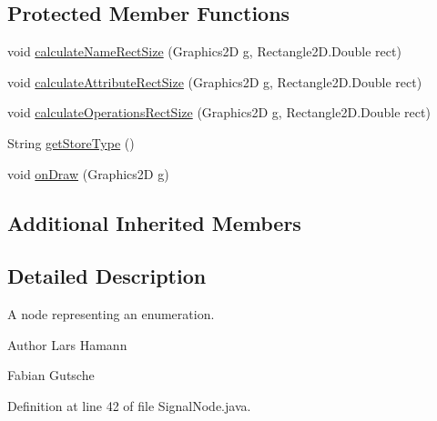 \subsection*{Protected Member Functions}
\begin{DoxyCompactItemize}
\item 
void \hyperlink{classorg_1_1tzi_1_1use_1_1gui_1_1views_1_1diagrams_1_1classdiagram_1_1_signal_node_afdb8c551c1f070d72bf37614e34f9742}{calculate\-Name\-Rect\-Size} (Graphics2\-D g, Rectangle2\-D.\-Double rect)
\item 
void \hyperlink{classorg_1_1tzi_1_1use_1_1gui_1_1views_1_1diagrams_1_1classdiagram_1_1_signal_node_a64b7da3d87dfedd68531751924203991}{calculate\-Attribute\-Rect\-Size} (Graphics2\-D g, Rectangle2\-D.\-Double rect)
\item 
void \hyperlink{classorg_1_1tzi_1_1use_1_1gui_1_1views_1_1diagrams_1_1classdiagram_1_1_signal_node_a11d72401f12a7cccb816b663c3adbdc0}{calculate\-Operations\-Rect\-Size} (Graphics2\-D g, Rectangle2\-D.\-Double rect)
\item 
String \hyperlink{classorg_1_1tzi_1_1use_1_1gui_1_1views_1_1diagrams_1_1classdiagram_1_1_signal_node_ac550fb54ba18b999593d43695994cc2d}{get\-Store\-Type} ()
\item 
void \hyperlink{classorg_1_1tzi_1_1use_1_1gui_1_1views_1_1diagrams_1_1classdiagram_1_1_signal_node_a17ea1cce87bea6aaf2813ee4ec69b919}{on\-Draw} (Graphics2\-D g)
\end{DoxyCompactItemize}
\subsection*{Additional Inherited Members}


\subsection{Detailed Description}
A node representing an enumeration.

\begin{DoxyAuthor}{Author}
Lars Hamann 

Fabian Gutsche 
\end{DoxyAuthor}


Definition at line 42 of file Signal\-Node.\-java.



